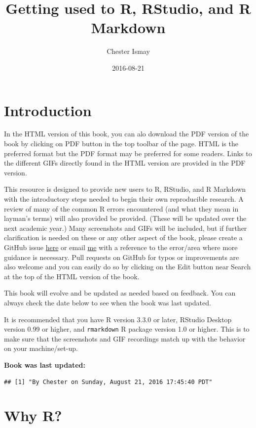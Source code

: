 \documentclass[]{tufte-book}
\title{Getting used to R, RStudio, and R Markdown}
\author{Chester Ismay}
\date{2016-08-21}
\begin{document}
\maketitle



{
\setcounter{tocdepth}{1}
\tableofcontents
}

\chapter{Introduction}\label{intro}

In the HTML version of this book, you can alo download the PDF version
of the book by clicking on PDF button in the top toolbar of the page.
HTML is the preferred format but the PDF format may be preferred for
some readers. Links to the different GIFs directly found in the HTML
version are provided in the PDF version.

This resource is designed to provide new users to R, RStudio, and R
Markdown with the introductory steps needed to begin their own
reproducible research. A review of many of the common R errors
encountered (and what they mean in layman's terms) will also provided be
provided. (These will be updated over the next academic year.) Many
screenshots and GIFs will be included, but if further clarification is
needed on these or any other aspect of the book, please create a GitHub
issue \href{https://github.com/ismayc/rbasics/issues}{here} or email
\href{mailto:chester.ismay@gmail.com}{me} with a reference to the
error/area where more guidance is necessary. Pull requests on GitHub for
typos or improvements are also welcome and you can easily do so by
clicking on the Edit button near Search at the top of the HTML version
of the book.

This book will evolve and be updated as needed based on feedback. You
can always check the date below to see when the book was last updated.

It is recommended that you have R version 3.3.0 or later, RStudio
Desktop version 0.99 or higher, and \texttt{rmarkdown} R package version
1.0 or higher. This is to make sure that the screenshots and GIF
recordings match up with the behavior on your machine/set-up.

\textbf{Book was last updated:}

\begin{verbatim}
## [1] "By Chester on Sunday, August 21, 2016 17:45:40 PDT"
\end{verbatim}

\chapter{Why R?}\label{whyR}
\end{document}
